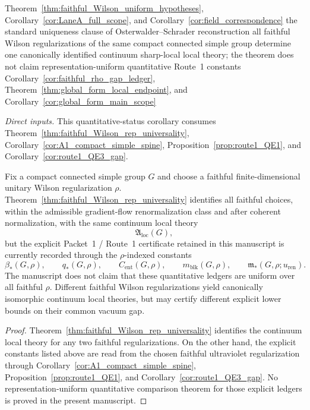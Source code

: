 \dependencyledger
  {Theorem~\ref{thm:faithful_Wilson_uniform_hypotheses}, Corollary~\ref{cor:LaneA_full_scope}, and Corollary~\ref{cor:field_correspondence}}
  {the standard uniqueness clause of Osterwalder--Schrader reconstruction}
  {all faithful Wilson regularizations of the same compact connected simple group determine one canonically identified continuum sharp-local local theory; the theorem does not claim representation-uniform quantitative Route~1 constants}
  {Corollary~\ref{cor:faithful_rho_gap_ledger}, Theorem~\ref{thm:global_form_local_endpoint}, and Corollary~\ref{cor:global_form_main_scope}}

\noindent\emph{Direct inputs.} This quantitative-status corollary consumes Theorem~\ref{thm:faithful_Wilson_rep_universality}, Corollary~\ref{cor:A1_compact_simple_spine}, Proposition~\ref{prop:route1_QE1}, and Corollary~\ref{cor:route1_QE3_gap}.\par

\begin{corollary}
\label{cor:faithful_rho_gap_ledger}
Fix a compact connected simple group $G$ and choose a faithful finite-dimensional unitary Wilson regularization $\rho$.
Theorem~\ref{thm:faithful_Wilson_rep_universality} identifies all faithful choices, within the admissible gradient-flow renormalization class and after coherent normalization, with the same continuum local theory
\[
\mathfrak A_{\mathrm{loc}}(G),
\]
but the explicit Packet~1 / Route~1 certificate retained in this manuscript is currently recorded through the $\rho$-indexed constants
\[
\beta_\ast(G,\rho),\qquad q_\ast(G,\rho),\qquad C_{\mathrm{ent}}(G,\rho),\qquad
m_{\mathrm{blk}}(G,\rho),\qquad \mathfrak m_\ast(G,\rho;u_{\mathrm{ren}}).
\]
The manuscript does not claim that these quantitative ledgers are uniform over all faithful $\rho$.
Different faithful Wilson regularizations yield canonically isomorphic continuum local theories, but may certify different explicit lower bounds on their common vacuum gap.
\end{corollary}

\begin{proof}
Theorem~\ref{thm:faithful_Wilson_rep_universality} identifies the continuum local theory for any two faithful regularizations.
On the other hand, the explicit constants listed above are read from the chosen faithful ultraviolet regularization through
Corollary~\ref{cor:A1_compact_simple_spine}, Proposition~\ref{prop:route1_QE1}, and Corollary~\ref{cor:route1_QE3_gap}.
No representation-uniform quantitative comparison theorem for those explicit ledgers is proved in the present manuscript.
\end{proof}


